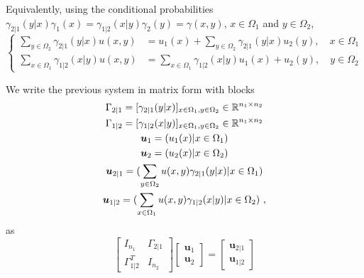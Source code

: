 \documentclass[runningheads]{llncs}
\begin{document}
Equivalently, using the conditional probabilities $\gamma_{2|1}(y|x) \gamma_1(x) = \gamma_{1|2}(x|y) \gamma_2(y) = \gamma(x,y)$, $x \in \Omega_1$ and $y \in \Omega_2$,
%
\begin{equation*}
\begin{cases}
  \sum_{y \in \Omega_2} \gamma_{2|1}(y|x)u(x,y) &= u_1(x) + \sum_{y \in \Omega_2} \gamma_{2|1}(y|x) u_2(y) , \quad x \in \Omega_1 \\
  \sum_{x \in \Omega_1} \gamma_{1|2}(x|y)u(x,y) &= \sum_{x \in \Omega_1} \gamma_{1|2}(x|y) u_1(x)  + u_2(y) , \quad y \in \Omega_2
\end{cases}
\end{equation*}
%

We write the previous system in matrix form with blocks
\begin{gather*}
  \Gamma_{2|1} = [\gamma_{2|1}(y|x)]_{x \in \Omega_1, y \in \Omega_2} \in \mathbb R^{n_1 \times n_2} \\
  \Gamma_{1|2} = [\gamma_{1|2}(x|y)]_{x \in \Omega_1, y \in \Omega_2} \in \mathbb R^{n_1 \times n_2} \\
  \bm u_1 = (u_1(x) | x \in \Omega_1) \\
  \bm u_2 = (u_2(x) | x \in \Omega_2) \\
  \bm u_{2|1} = (\sum_{y \in \Omega_2} u(x,y)\gamma_{2|1}(y|x) | x \in \Omega_1) \\
  \bm u_{1|2} = (\sum_{x\in\Omega_1} u(x,y)\gamma_{1|2}(x|y) | x \in \Omega_2) \ ,
\end{gather*}
as 
\begin{equation}
\label{eq:block}
  \begin{bmatrix}
    I_{n_1} & \Gamma_{2|1} \\ \Gamma_{1|2}^T & I_{n_2}
  \end{bmatrix}
  \begin{bmatrix}
    \bm u_1 \\ \bm u_2
  \end{bmatrix}
=
\begin{bmatrix}
  \bm u_{2|1} \\ \bm u_{1|2}
\end{bmatrix}
\end{equation}
\end{document}

